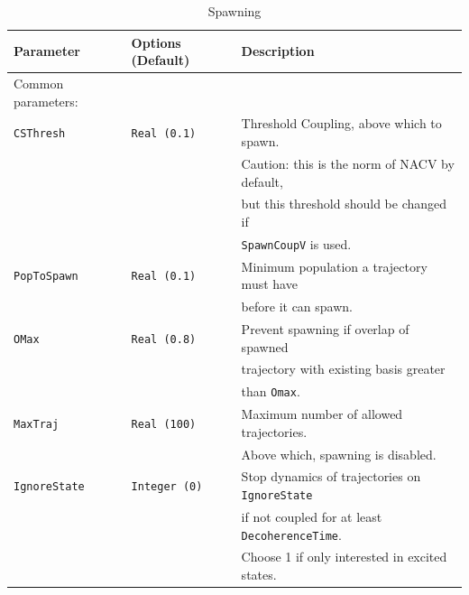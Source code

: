 \documentclass[11pt]{article}
\begin{document}

\clearpage
\newpage
\begin{table}[h]
\caption{Spawning}
\begin{tabular}{ l l l }
\hline\hline
Parameter & Options (Default)& Description \\
\hline
Common parameters:\\
{\tt CSThresh}       & {\tt Real (0.1)}       & {\small Threshold Coupling, above which to spawn.}\\&&
{\small Caution: this is the norm of NACV by default,}\\ &&
{\small but this threshold should be changed if}\\ &&
{\small{\tt SpawnCoupV} is used.}\\
{\tt PopToSpawn}     & {\tt Real (0.1)}       & {\small Minimum population a trajectory must have}\\&&
                                                {\small before it can spawn.}\\
{\tt OMax}           & {\tt Real (0.8)}       & {\small Prevent spawning if overlap of spawned}\\&&
                                                {\small trajectory with existing basis greater}\\&&
                                                {\small than {\tt Omax}.}\\
{\tt MaxTraj}        & {\tt Real (100)}       & {\small Maximum number of allowed trajectories.}\\&&
                                                {\small Above which, spawning is disabled.}\\ 
{\tt IgnoreState}    & {\tt Integer (0)}      & {\small Stop dynamics of trajectories on {\tt IgnoreState}}\\&&
                                                {\small if not coupled for at least {\tt DecoherenceTime}.}\\&&
                                                {\small Choose 1 if only interested in excited states.}\\

\end{tabular}
\end{table}
\end{document}
